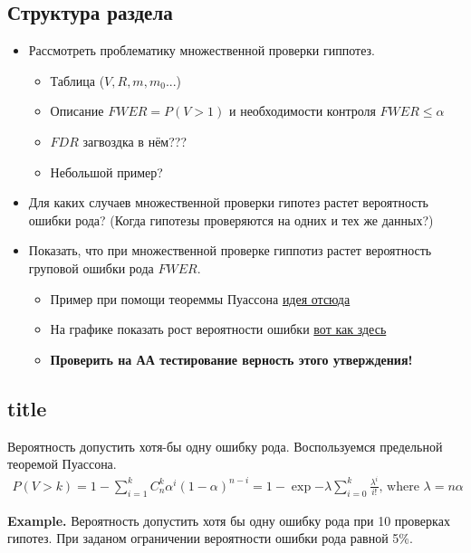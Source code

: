 \documentclass[a4paper,12pt]{article}
\newcommand{\rom}[1]{\uppercase\expandafter{\romannumeral #1\relax}}
\begin{document}
\subsection{Структура раздела}
\begin{itemize}
	\item Рассмотреть проблематику множественной проверки гиппотез. 
			\begin{itemize}
				\item Таблица ($V, R, m, m_0 ...$)
				\item Описание $FWER=P(V>1)$ и необходимости контроля $FWER\leq\alpha$
				\item $FDR$ загвоздка в нём???
				\item Небольшой пример?
			\end{itemize} 
	\item Для каких случаев множественной проверки гипотез растет вероятность ошибки \rom{1} рода? (Когда гипотезы проверяются на одних и тех же данных?)
	\item Показать, что при множественной проверке гиппотиз растет вероятность груповой ошибки \rom{1} рода $FWER$.
			\begin{itemize}
				\item Пример при помощи теореммы Пуассона \href{https://www.cs.cornell.edu/~asampson/blog/statsmistakes.html?utm_campaign=Data%2BElixir&utm_medium=email&utm_source=Data_Elixir_108}{идея отсюда}
				\item На графике показать рост вероятности ошибки \href{http://conversionxl.com/how-many-ab-test-variations/?utm_source=sumome&utm_medium=linkedin&utm_campaign=share}{вот как здесь}
				\item \textbf{Проверить на АА тестирование верность этого утверждения!}
			\end{itemize} 		
\end{itemize}

\subsection{title}
Вероятность допустить хотя-бы одну ошибку \rom{1} рода. Воспользуемся предельной теоремой Пуассона.
\begin{multline}
	P(V>k)= 
	1-\sum_{i=1}^{k}C_{n}^{k}\alpha^i(1-\alpha)^{n-i} = 
	1-\exp{-\lambda}\sum_{i=0}^{k}\frac{\lambda^i}{i!} 
	\text{, where } \lambda=n\alpha
\end{multline}

\textbf{Example.} Вероятность допустить хотя бы одну ошибку \rom{1} рода при 10 проверках гипотез. При заданом ограничении вероятности ошибки \rom{1} рода равной 5\%.
\end{document}
